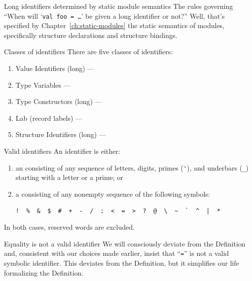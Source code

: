 \begin{remark}{Long identifiers determined by static module semantics}
The rules governing ``When will `\texttt{val foo = \dots}' be given a
long identifier or not?'' Well, that's specified by
Chapter~\ref{ch:static-modules} the static semantics of modules,
specifically structure declarations and structure bindings.
\end{remark}

\begin{clause}{Classes of identifiers}
There are five classes of identifiers:
\begin{enumerate}
\item Value Identifiers (long) --- \VId
\item Type Variables --- \TyVar
\item Type Constructors (long) --- \TyCon
\item Lab (record labels) --- \Lab
\item Structure Identifiers (long) --- \StrId
\end{enumerate}
\end{clause}

\begin{definition}{Valid identifiers}
An identifier is either:
\begin{enumerate}
\item an  consisting of
any sequence of letters, digits, primes (\verb#'#), and underbars
(\verb#_#) starting with a letter or a prime; or
\item a  consisting of any nonempty sequence
  of the following symbols: 
\vspace*{-6pt}
\begin{center}
\verb(!  %  &  $  #  +  -  /  :  <  =  >  ?  @  \  ~  `  ^  |  *(
\end{center}
\end{enumerate}
In both cases, reserved words are excluded.
\end{definition}

\begin{deviation}{Equality is not a valid identifier}
We will consciously deviate from the Definition and, consistent with our
choices made earlier, insist that ``\texttt{=}'' is not a valid symbolic
identifier. This deviates from the Definition, but it simplifies our
life formalizing the Definition.
\end{deviation}

